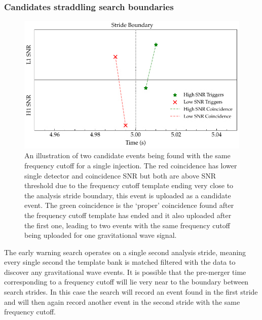 \subsubsection{\label{6:sec:cands-across-bounds}Candidates straddling search boundaries}
%
\begin{figure}
       \centering
    \includegraphics[width=\textwidth]{images/6_earlywarning/identified-problems/cands_across_bounds.pdf}
    \caption{An illustration of two candidate events being found with the same frequency cutoff for a single injection. The red coincidence has lower single detector and coincidence SNR but both are above SNR threshold due to the frequency cutoff template ending very close to the analysis stride boundary, this event is uploaded as a candidate event. The green coincidence is the `proper' coincidence found after the frequency cutoff template has ended and it also uploaded after the first one, leading to two events with the same frequency cutoff being uploaded for one gravitational wave signal.}
    \label{6:fig:candidates_across_boundaries}
\end{figure}
%

The early warning search operates on a single second analysis stride, meaning every single second the template bank is matched filtered with the data to discover any gravitational wave events. It is possible that the pre-merger time corresponding to a frequency cutoff will lie very near to the boundary between search strides. In this case the search will record an event found in the first stride and will then again record another event in the second stride with the same frequency cutoff.

